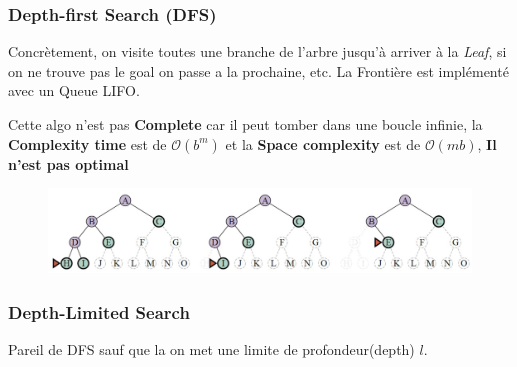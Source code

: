 		\subsubsection{Depth-first Search (DFS)}
		Concrètement, on visite toutes une branche de l'arbre jusqu'à arriver à la \textit{Leaf}, si on ne trouve pas le goal on passe a la prochaine, etc.
		La Frontière est implémenté avec un Queue LIFO.
		
		Cette algo n'est pas \textbf{Complete} car il peut tomber dans une boucle infinie, la \textbf{Complexity time} est de $\mathcal{O}(b^m)$ et la \textbf{Space complexity} est de $\mathcal{O}(mb)$, \textbf{Il n'est pas optimal}
		
		\begin{figure}[htp]
			\centering
			\includegraphics[width=\textwidth]{img/ExempleDFS.png}
		\end{figure}
		
		\subsubsection{Depth-Limited Search}
			Pareil de DFS sauf que la on met une limite de profondeur(depth) $l$.
		

